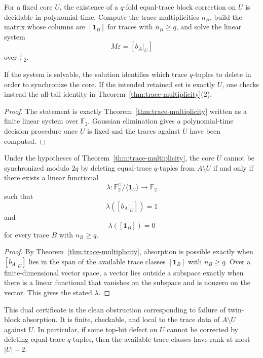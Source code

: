 \documentclass[thmsec,dntnbr,nolinenbrs]{dmgt}
\numberwithin{equation}{section}
\newcommand{\F}{\mathbb{F}}
\newcommand{\one}{\mathbf{1}}
\begin{document}
\begin{corollary}\label{cor:polytime-fixed-core}
For a fixed core \(U\), the existence of a \(q\)-fold equal-trace block correction on \(U\) is decidable in polynomial time.  Compute the trace multiplicities \(n_B\), build the matrix whose columns are \([\one_B]\) for traces with \(n_B\ge q\), and solve the linear system
\[
        M\varepsilon=[b_A|_U]
\]
over \(\F_2\).

If the system is solvable, the solution identifies which trace \(q\)-tuples to delete in order to synchronize the core.  If the intended retained set is exactly \(U\), one checks instead the all-tail identity in Theorem~\ref{thm:trace-multiplicity}\textup{(2)}.
\end{corollary}

\begin{proof}
The statement is exactly Theorem~\ref{thm:trace-multiplicity} written as a finite linear system over \(\F_2\).  Gaussian elimination gives a polynomial-time decision procedure once \(U\) is fixed and the traces against \(U\) have been computed.
\end{proof}

\begin{corollary}\label{cor:dual-certificate}
Under the hypotheses of Theorem~\ref{thm:trace-multiplicity}, the core \(U\) cannot be synchronized modulo \(2q\) by deleting equal-trace \(q\)-tuples from \(A\setminus U\) if and only if there exists a linear functional
\[
        \lambda:\F_2^U/\langle \one_U\rangle\to\F_2
\]
such that
\[
        \lambda([b_A|_U])=1
\]
and
\[
        \lambda([\one_B])=0
\]
for every trace \(B\) with \(n_B\ge q\).
\end{corollary}

\begin{proof}
By Theorem~\ref{thm:trace-multiplicity}, absorption is possible exactly when \([b_A|_U]\) lies in the span of the available trace classes \([\one_B]\) with \(n_B\ge q\).  Over a finite-dimensional vector space, a vector lies outside a subspace exactly when there is a linear functional that vanishes on the subspace and is nonzero on the vector.  This gives the stated \(\lambda\).
\end{proof}

This dual certificate is the clean obstruction corresponding to failure of twin-block absorption.  It is finite, checkable, and local to the trace data of \(A\setminus U\) against \(U\).  In particular, if some top-bit defect on \(U\) cannot be corrected by deleting equal-trace \(q\)-tuples, then the available trace classes have rank at most \(|U|-2\).
\end{document}

